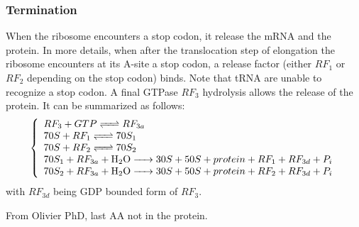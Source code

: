 

\subsubsection{Termination}
When the ribosome encounters a stop codon, it release the mRNA and the protein. In more details, when after the translocation step of elongation the ribosome encounters at its A-site a stop codon, a release factor (either $RF_1$ or $RF_2$ depending on the stop codon) binds. Note that tRNA are unable to recognize a stop codon. A final GTPase $RF_3$ hydrolysis allows the release of the protein. It can be summarized as follows:
$$
  \left\{
    \begin{array}{l}
      \reactionRev{RF_3 + GTP}{RF_{3a}}{}{} \\
      \reactionRev{70S + RF_1}{70S_1}{}{} \\
      \reactionRev{70S + RF_2}{70S_2}{}{} \\
      \reactionIrr{70S_1 + RF_{3a} + \ce{H2O}}{30S + 50S + protein + RF_1 + RF_{3d} + P_i}{}{} \\
      \reactionIrr{70S_2 + RF_{3a} + \ce{H2O}}{30S + 50S + protein + RF_2 + RF_{3d} + P_i}{}{} \\
    \end{array}
  \right.
$$
with $RF_{3d}$ being GDP bounded form of $RF_3$.

\textcolor[rgb]{1.00,0.00,0.00}{From Olivier PhD, last AA not in the protein.}



